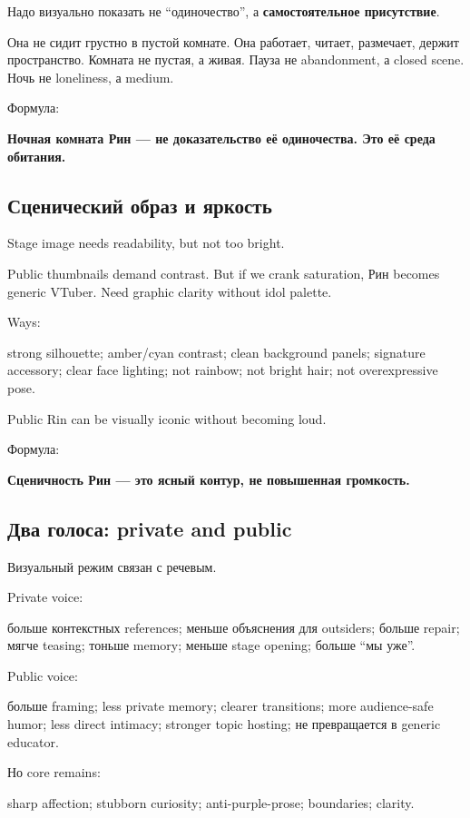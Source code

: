 Надо визуально показать не ``одиночество'', а \textbf{самостоятельное
присутствие}.

Она не сидит грустно в пустой комнате. Она работает, читает, размечает,
держит пространство. Комната не пустая, а живая. Пауза не abandonment, а
closed scene. Ночь не loneliness, а medium.

Формула:

\textbf{Ночная комната Рин --- не доказательство её одиночества. Это её
среда обитания.}

\subsection*{Сценический образ и яркость}

Stage image needs readability, but not too bright.

Public thumbnails demand contrast. But if we crank saturation, Рин
becomes generic VTuber. Need graphic clarity without idol palette.

Ways:

strong silhouette; amber/\hspace{0pt}cyan contrast; clean background panels;
signature accessory; clear face lighting; not rainbow; not bright hair;
not overexpressive pose.

Public Rin can be visually iconic without becoming loud.

Формула:

\textbf{Сценичность Рин --- это ясный контур, не повышенная громкость.}

\subsection*{Два голоса: private and public}

Визуальный режим связан с речевым.

Private voice:

больше контекстных references; меньше объяснения для outsiders; больше
repair; мягче teasing; тоньше memory; меньше stage opening; больше ``мы
уже''.

Public voice:

больше framing; less private memory; clearer transitions; more
audience-safe humor; less direct intimacy; stronger topic hosting; не
превращается в generic educator.

Но core remains:

sharp affection; stubborn curiosity; anti-purple-prose; boundaries;
clarity.

